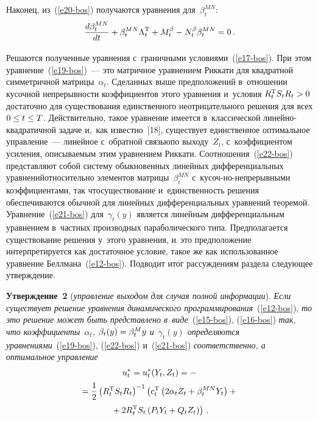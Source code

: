 \begin{multicols}{2}
        Наконец, из~(\ref{e20-bos}) получаются уравнения 
для~$\beta_t^{MN}$:
     \begin{equation}
     \displaystyle\frac{\displaystyle d\beta_t^{MN}\mathstrut}{\displaystyle dt\mathstrut}+\beta_t^{MN} \Lambda_t^{\mathrm{T}} +M_t^\beta -
N_t^\beta \beta_t^{MN} =0\,.
     \label{e22-bos}
\end{equation}

\vspace*{-9pt}

     Решаются полученные уравнения с~граничными  
условиями~(\ref{e17-bos}). При этом уравнение~(\ref{e19-bos})~--- это 
матричное уравнением Риккати для квадратной симметричной 
матрицы~$\alpha_t$. Сделанных выше предположений в~отношении 
кусочной непрерывности коэффициентов этого уравнения и~условия $R_t^{\mathrm{T}} 
S_t R_t\hm>0$ достаточно для существования единственного 
неотрицательного решения для всех $0\hm\leq t\hm\leq T$. Действительно, 
такое уравнение имеется в~классической ли\-ней\-но-квад\-ра\-тич\-ной задаче 
и,~как известно~[18], существует единственное оптимальное управление~--- 
линейное с~обратной связью\linebreak по выходу~$Z_t$, с~коэффициентом усиления, 
описываемым этим урав\-не\-ни\-ем Риккати. Соотноше\-ния~(\ref{e22-bos}) 
представляют собой сис\-те\-му обыкновен\-ных линейных дифференциальных 
урав\-не\-ний\linebreak относительно элементов матрицы~$\beta_t^{MN}$  
с~ку\-соч-\linebreak но-не\-пре\-рыв\-ны\-ми коэффициентами, 
так что\linebreak существование и~единственность решения обеспечиваются обычной для линейных 
дифференциальных уравнений теоремой. Уравнение~(\ref{e21-bos}) 
для~$\gamma_t(y)$ является линейным дифференциальным уравнением 
в~частных производных параболического типа. Предполагается 
существование решения у~этого уравнения, и~это предположение 
интерпретируется как достаточное условие, такое же как использованное 
уравнение Беллмана~(\ref{e12-bos}). Подводит итог рассуждениям раздела 
следующее утверж\-дение.
{ %

}
     
     \smallskip
     
     \noindent
     \textbf{Утверждение~2} (\textit{управление выходом для случая полной 
информации}). \textit{Если существует решение уравнения динамического 
программирования}~(\ref{e12-bos}), \textit{то это решение может быть 
представлено в~виде}~(\ref{e15-bos}), (\ref{e16-bos}) \textit{так, что 
коэффициенты~$\alpha_t$, $\beta_t(y)\hm= \beta_t^M y$ и~$\gamma_t(y)$ 
определяются уравнениями}~(\ref{e19-bos}), (\ref{e22-bos}) и~(\ref{e21-bos}) 
\textit{соответственно, а оптимальное управление}
     \begin{multline}
     u_t^*=u_t^*(Y_t, Z_t) =-{}\\
     {}=\displaystyle\frac{\displaystyle 1\mathstrut}{\displaystyle 2\mathstrut}\left( R_t^{\mathrm{T}} S_t R_t\right)^{-1} \left( 
c_t^{\mathrm{T}} \left( 2\alpha_t Z_t +\beta_t^{MN} Y_t\right) +{}\right.\\
\left.{}+2R_t^{\mathrm{T}} S_t\left( P_t 
Y_t+Q_t Z_t\right)\right)\,.
     \label{e23-bos}
\end{multline}


\end{multicols}
